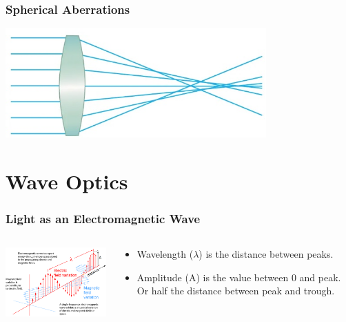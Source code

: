 \documentclass{beamer}
\begin{document}
\begin{frame}\frametitle{Spherical Aberrations}

\begin{center}
\includegraphics[width=10cm]{fig/sphereAbb.jpg}
\end{center}

\end{frame}




\section{Wave Optics}

\begin{frame}\frametitle{Light as an Electromagnetic Wave}
\begin{columns}
\begin{column}{7cm}
\begin{center}
\includegraphics[width=7cm]{fig/emwave2.png}
\end{center}
\end{column}
\begin{column}{4cm}
\begin{itemize}
\item Wavelength ($\lambda$) is the distance between peaks.
\item Amplitude (A) is the value between 0 and peak. Or half the distance between peak and trough.
\end{itemize}
\end{column}
\end{columns}
\end{frame}
\end{document}
